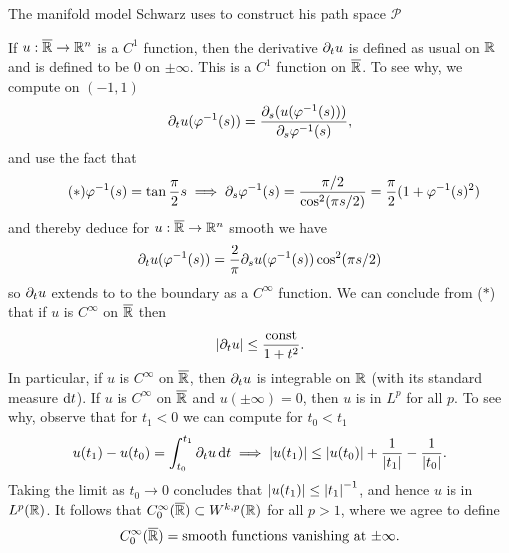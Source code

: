 \documentclass{amsart}
\begin{document}
\begin{clear}{The manifold model Schwarz uses to construct his path
    space $\mathscr{P}$}
\begin{defn}
  If $u:\overline{\mathbb{R}}\to \mathbb{R}^{n}$ is a $C^{1}$ function, then the derivative $\partial_{t}u$ is defined as usual on $\mathbb{R}$ and is defined to be $0$ on $\pm \infty$. This is a $C^{1}$ function on $\overline{\mathbb{R}}$. To see why, we compute on $(-1,1)$
  \begin{equation*}
    \partial_{t}u(\varphi^{-1}(s))=\frac{\partial_{s}(u(\varphi^{-1}(s)))}{\partial_{s}\varphi^{-1}(s)},
  \end{equation*}
  and use the fact that
  \begin{equation*}\tag{$\ast$}
    \varphi^{-1}(s)=\tan\frac{\pi}{2}s\implies \partial_{s}\varphi^{-1}(s)=\frac{\pi/2}{\cos^{2}(\pi s/2)}=\frac{\pi}{2}(1+\varphi^{-1}(s)^{2})
  \end{equation*}
  and thereby deduce for $u:\overline{\mathbb{R}}\to \mathbb{R}^{n}$ smooth we have
  \begin{equation*}
    \partial_{t}u(\varphi^{-1}(s))=\frac{2}{\pi}\partial_{s}u(\varphi^{-1}(s)) \cos^{2}(\pi s/2)
  \end{equation*}
  so $\partial_{t}u$ extends to to the boundary as a $C^{\infty}$ function. We can conclude from ($\ast$) that if $u$ is $C^{\infty}$ on $\overline{\mathbb{R}}$ then
  \begin{equation*}
    \left|\partial_{t}u\right|\le \frac{\text{const}}{1+t^{2}}.
  \end{equation*}
  In particular, if $u$ is $C^{\infty}$ on $\overline{\mathbb{R}}$, then $\partial_{t}u$ is integrable on $\mathbb{R}$ (with its standard measure $\mathrm{d} t$). If $u$ is $C^{\infty}$ on $\overline{\mathbb{R}}$ and $u(\pm\infty)=0$, then $u$ is in $L^{p}$ for all $p$. To see why, observe that for $t_{1}<0$ we can compute for $t_{0}<t_{1}$
  \begin{equation*}
    u(t_{1})-u(t_{0})=\int_{t_{0}}^{t_{1}}\partial_{t}u\,\mathrm{d} t\implies \left|u(t_{1})\right|\le \left|u(t_{0})\right|+\frac{1}{\left|t_{1}\right|}-\frac{1}{\left|t_{0}\right|}.
  \end{equation*}
  Taking the limit as $t_{0}\to 0$ concludes that $\left|u(t_{1})\right|\le
  \left|t_{1}\right|^{-1}$, and hence $u$ is in $L^{p}(\mathbb{R})$. It follows that
  $C^{\infty}_{0}(\overline{\mathbb{R}})\subset W^{k,p}(\mathbb{R})$ for all $p>1$, where
  we agree to define $$C^{\infty}_{0}(\overline{\mathbb{R}})=\text{smooth
    functions vanishing at $\pm \infty$}.$$


\end{defn}
\end{clear}
\end{document}
